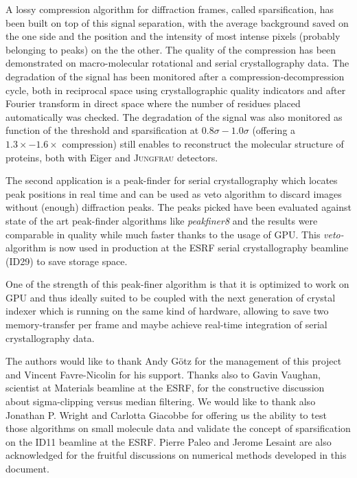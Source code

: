 \documentclass[preprint]{iucr}              %
\begin{document}
A lossy compression algorithm for diffraction frames, called sparsification, has been built on top of this signal separation, with the average background saved on the one side and the position and the intensity of most intense pixels (probably belonging to peaks) on the the other.
The quality of the compression has been demonstrated on macro-molecular rotational and serial crystallography data. 
The degradation of the signal has been monitored after a compression-decompression cycle, both in reciprocal space using crystallographic quality indicators and after Fourier transform in direct space where the number of residues placed automatically was checked.
The degradation of the signal was also monitored as function of the threshold and sparsification at $0.8\sigma-1.0\sigma$ (offering a $1.3\times-1.6\times$ compression) still enables to reconstruct the molecular structure of proteins, both with Eiger and \textsc{Jungfrau} detectors.

The second application is a peak-finder for serial crystallography which locates peak positions in real time and can be used as veto algorithm to discard images without (enough) diffraction peaks. 
The peaks picked have been evaluated against state of the art peak-finder algorithms like \textit{peakfiner8} and the results were comparable in quality while much faster thanks to the usage of GPU.  
This \textit{veto-}algorithm is now used in production at the ESRF serial crystallography beamline (ID29) to save storage space.

One of the strength of this peak-finer algorithm is that it is optimized to work on GPU and thus ideally suited to be coupled with the next generation of crystal indexer \cite{toro} which is running on the same kind of hardware, allowing to save two memory-transfer per frame and maybe achieve real-time integration of serial crystallography data.



The authors would like to thank Andy G\"otz for the management of this project and Vincent Favre-Nicolin for his support.
Thanks also to Gavin Vaughan, scientist at Materials beamline at the ESRF,  for the constructive discussion about sigma-clipping versus median filtering.
We would like to thank also Jonathan P. Wright and Carlotta Giacobbe for offering us the ability to test those algorithms on small molecule data and validate the concept of sparsification on the ID11 beamline at the ESRF.
Pierre Paleo and Jerome Lesaint are also acknowledged for the fruitful discussions on numerical methods developed in this document.



\end{document}
